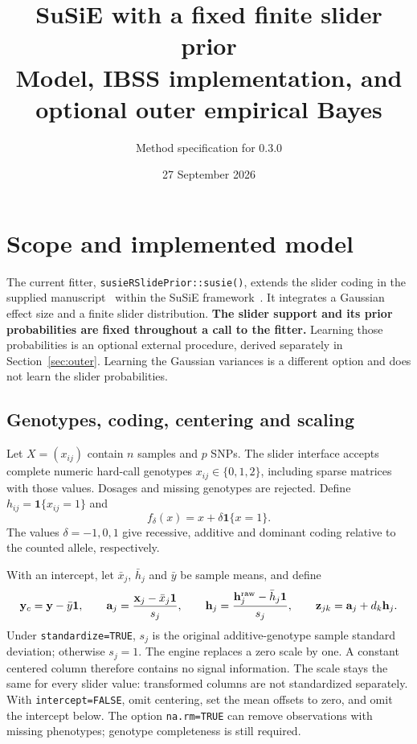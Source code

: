 \documentclass[11pt]{article}
\title{SuSiE with a fixed finite slider prior\\
\large Model, IBSS implementation, and optional outer empirical Bayes}
\author{Method specification for \pkg{} 0.3.0}
\date{27 September 2026}
\newcommand{\ind}{\mathbf 1}
\newcommand{\yb}{\mathbf y_c}
\begin{document}
\maketitle

\section{Scope and implemented model}
\label{sec:model}
The current fitter, \texttt{susieRSlidePrior::susie()}, extends the
slider coding in the supplied manuscript~\cite{slider} within the SuSiE
framework~\cite{susie}. It integrates a Gaussian effect size and a finite
slider distribution. \textbf{The slider support and its prior probabilities
are fixed throughout a call to the fitter.} Learning those probabilities is
an optional external procedure, derived separately in Section~\ref{sec:outer}.
Learning the Gaussian variances is a different option and does not learn
the slider probabilities.

\subsection{Genotypes, coding, centering and scaling}
Let $X=(x_{ij})$ contain $n$ samples and $p$ SNPs. The slider interface accepts
complete numeric hard-call genotypes $x_{ij}\in\{0,1,2\}$, including sparse
matrices with those values. Dosages and missing genotypes are rejected.
Define $h_{ij}=\ind\{x_{ij}=1\}$ and
\begin{equation}
 f_\delta(x)=x+\delta\ind\{x=1\}.
 \label{eq:coding}
\end{equation}
The values $\delta=-1,0,1$ give recessive, additive and dominant coding
relative to the counted allele, respectively.

With an intercept, let $\bar x_j$, $\bar h_j$ and $\bar y$ be sample means,
and define
\begin{equation}
 \yb=\mathbf y-\bar y\mathbf1,\qquad
 \mathbf a_j=\frac{\mathbf x_j-\bar x_j\mathbf1}{s_j},\qquad
 \mathbf h_j=\frac{\mathbf h_j^{\rm raw}-\bar h_j\mathbf1}{s_j},\qquad
 \mathbf z_{jk}=\mathbf a_j+d_k\mathbf h_j.
 \label{eq:design}
\end{equation}
Under \texttt{standardize=TRUE}, $s_j$ is the original additive-genotype
sample standard deviation; otherwise $s_j=1$. The engine replaces a zero
scale by one. A constant centered column therefore contains no signal
information. The scale stays the same for every slider value: transformed
columns are not standardized separately. With \texttt{intercept=FALSE},
omit centering, set the mean offsets to zero, and omit the intercept below.
The option \texttt{na.rm=TRUE} can remove observations with missing
phenotypes; genotype completeness is still required.
\end{document}

